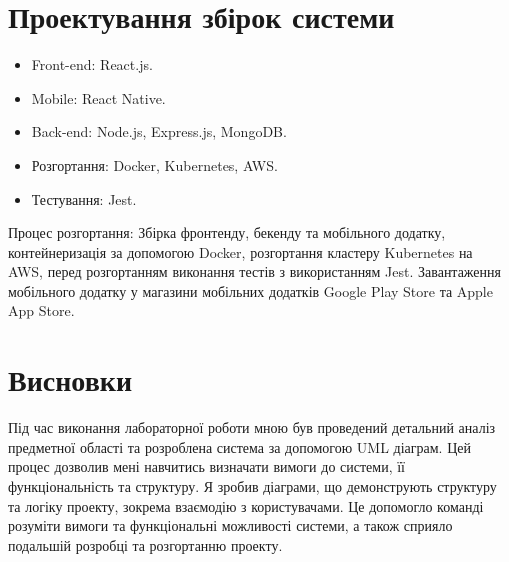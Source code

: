 \documentclass[oneside,14pt]{extarticle}
\begin{document}
\begin{normalsize}
	\section*{Проектування збірок системи}
	\begin{itemize}
		\item Front-end: React.js.
		\item Mobile: React Native.
		\item Back-end: Node.js, Express.js, MongoDB.
		\item Розгортання: Docker, Kubernetes, AWS.
		\item Тестування: Jest.
	\end{itemize}
	
	Процес розгортання: Збірка фронтенду, бекенду та мобільного додатку, контейнеризація за допомогою Docker, розгортання кластеру Kubernetes на AWS, перед розгортанням виконання тестів з використанням Jest. Завантаження мобільного додатку у магазини мобільних додатків Google Play Store та Apple App Store.

	\section*{Висновки}
	   Під час виконання лабораторної роботи мною був проведений детальний аналіз предметної області та розроблена система за допомогою UML діаграм. Цей процес дозволив мені навчитись визначати вимоги до системи, її функціональність та структуру. Я зробив діаграми, що демонструють структуру та логіку проекту, зокрема взаємодію з користувачами. Це допомогло команді розуміти вимоги та функціональні можливості системи, а також сприяло подальшій розробці та розгортанню проекту.
\end{normalsize}
\end{document}
